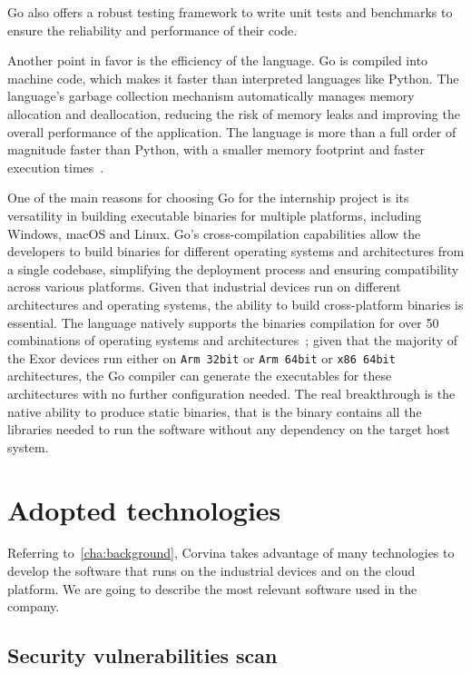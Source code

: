 Go also offers a robust testing framework to write unit tests and benchmarks to ensure the reliability and performance of their code.

Another point in favor is the efficiency of the language. Go is compiled into machine code, which makes it faster than interpreted languages like Python. The language's garbage collection mechanism automatically manages memory allocation and deallocation, reducing the risk of memory leaks and improving the overall performance of the application. The language is more than a full order of magnitude faster than Python, with a smaller memory footprint and faster execution times~\cite{go-lang-performance}.

One of the main reasons for choosing Go for the internship project is its versatility in building executable binaries for multiple platforms, including Windows, macOS and Linux. Go's cross-compilation capabilities allow the developers to build binaries for different operating systems and architectures from a single codebase, simplifying the deployment process and ensuring compatibility across various platforms. Given that industrial devices run on different architectures and operating systems, the ability to build cross-platform binaries is essential. The language natively supports the binaries compilation for over 50 combinations of operating systems and architectures~\cite{go-lang-compilation-combo}; given that the majority of the Exor devices run either on \texttt{Arm 32bit} or \texttt{Arm 64bit} or \texttt{x86 64bit} architectures, the Go compiler can generate the executables for these architectures with no further configuration needed. The real breakthrough is the native ability to produce static binaries, that is the binary contains all the libraries needed to run the software without any dependency on the target host system.

\section{Adopted technologies}

Referring to~\cref{cha:background}, Corvina takes advantage of many technologies to develop the software that runs on the industrial devices and on the cloud platform. We are going to describe the most relevant software used in the company.

\subsection{Security vulnerabilities scan}

